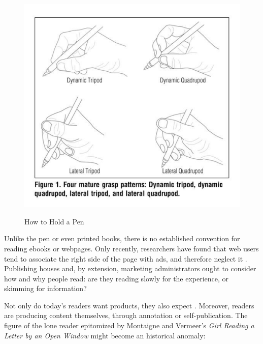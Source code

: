 \documentclass[12pt,a4paper]{scrartcl}
\begin{document}
{}
\begin{figure}[H]
\includegraphics[scale=0.32]{hands}
\centering
\caption{How to Hold a Pen}\protect\autocite[719]{pen}
\label{Fig.2}
\centering
\end{figure}

Unlike the pen or even printed books, there is no established convention for reading ebooks or webpages. Only recently, researchers have found that web users tend to associate the right side of the page with ads, and therefore neglect it \autocite[687]{popa}. Publishing houses and, by extension, marketing administrators ought to consider how and why people read: are they reading slowly for the experience, or skimming for information?

 Not only do today's readers want products, they also expect  \autocite[21]{martin}. Moreover, readers are producing content themselves, through annotation or self-publication. The figure of the lone reader epitomized by Montaigne and Vermeer's \textit{Girl Reading a Letter by an Open Window} might become an historical anomaly:
\end{document}
